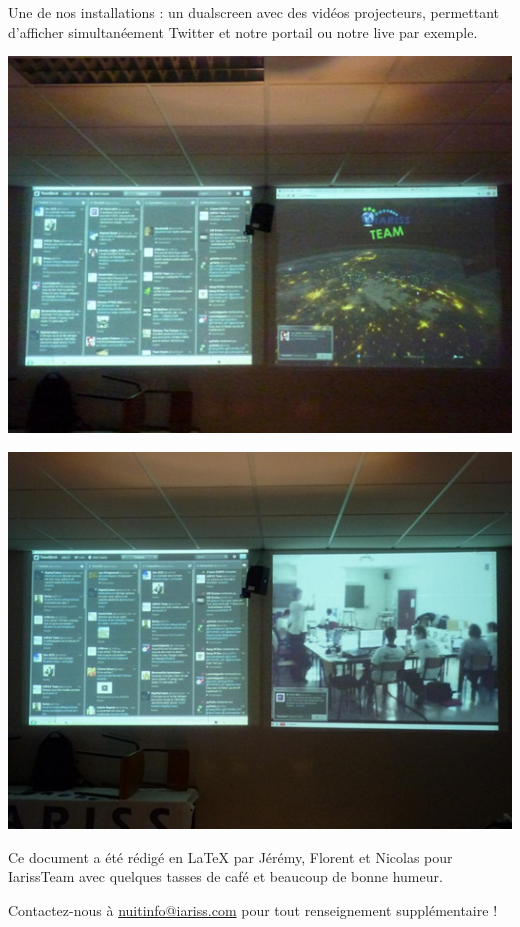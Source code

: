 \documentclass[12pt, a4paper]{article}
\newcommand{\espace}{\vspace{.8cm}}
\newcommand{\authors}{Jérémy, Florent et Nicolas}
\begin{document}
Une de nos installations : un dualscreen avec des vidéos projecteurs, permettant d'afficher simultanéement Twitter et notre portail ou notre live par exemple.
\espace{}
\begin{center}
\includegraphics[width=.9\textwidth, keepaspectratio=true]{img/photo1.png}
\end{center}
\espace{}
\begin{center}
\includegraphics[width=.9\textwidth, keepaspectratio=true]{img/photo2.png}
\end{center}
\espace{}



\espace\vfill{}
Ce document a été rédigé en \LaTeX{} par \authors{} pour IarissTeam avec quelques tasses de café et beaucoup de bonne humeur.

Contactez-nous à \href{mailto:nuitinfo@iariss.com}{nuitinfo@iariss.com} pour tout renseignement supplémentaire !
\end{document}
